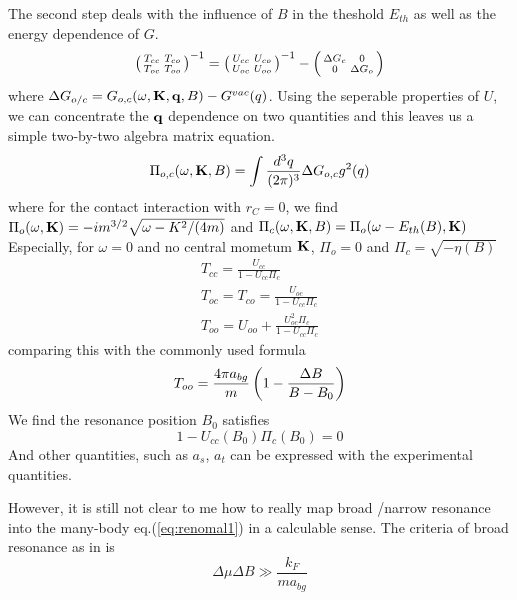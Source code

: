 The second step deals with the influence of $B$ in the theshold $E_{th}$ as well as the energy dependence of $G$. 
 \begin{equation}
  {\ensuremath{\left(\begin{smallmatrix}T_{cc}&T_{co}\\T_{oc}&T_{oo}\end{smallmatrix}\right)}}^{-1}={\left(\begin{smallmatrix}U_{cc}&U_{co}\\U_{oc}&U_{oo}\end{smallmatrix}\right)}^{-1}-{\left(\begin{smallmatrix}\Delta{}G_c&0\\0&\Delta{}G_o\end{smallmatrix}\right)}
\end{equation}
where $\Delta{}G_{o/c}=G_{o,c}(\omega,\mathbf{K},\mathbf{q},B)-G^{vac}(q)$.  Using the seperable properties of $U$, we can concentrate the $\mathbf{q}$ dependence on two quantities and this leaves us a simple two-by-two algebra matrix equation.  
\begin{equation}
\Pi_{o,c}(\omega,\mathbf{K},B)=\int\frac{d^3q}{(2\pi)^3}\Delta{}G_{o,c}g^2(q)                  
\end{equation}
where for the contact interaction with $r_C=0$, we find $\Pi_o(\omega,\mathbf{K})=-im^{3/2}\sqrt{\omega-K^2/(4m)}$ and $\Pi_c(\omega,\mathbf{K},B)=\Pi_o(\omega-E_{th}(B),\mathbf{K})$
Especially, for $\omega=0$ and no central mometum $\mathbf{K}$, $\Pi_o=0$ and $\Pi_c=\sqrt{-\eta(B)}$
\begin{gather}\label{eq:T}
 T_{cc}=\frac{U_{cc}}{1-U_{cc}\Pi_c}\\
T_{oc}=T_{co}=\frac{U_{oc}}{1-U_{cc}\Pi_c}\\
T_{oo}=U_{oo}+\frac{U_{oc}^2\Pi_c}{1-U_{cc}\Pi_c}
\end{gather}
comparing this with the commonly used formula 
\begin{equation}
 T_{oo}=\frac{4\pi{}a_{bg}}{m}\left(1-\frac{\Delta{}B}{B-B_0}\right)
\end{equation}
We find the resonance position $B_0$ satisfies
\begin{equation}
 1-U_{cc}(B_0)\Pi_c(B_0)=0
\end{equation}
And other quantities, such as $a_s$, $a_t$ can be expressed with the experimental quantities. 

However, it is still not clear to me how to really map broad /narrow resonance into the many-body eq.(\ref{eq:renomal1}) in a calculable sense.  The criteria of broad resonance as in \cite{JacksonNarrow} is   
\begin{equation}\label{eq:broadCriteria}
\Delta\mu\Delta{}B\gg\frac{k_F}{ma_{bg}}
\end{equation}


